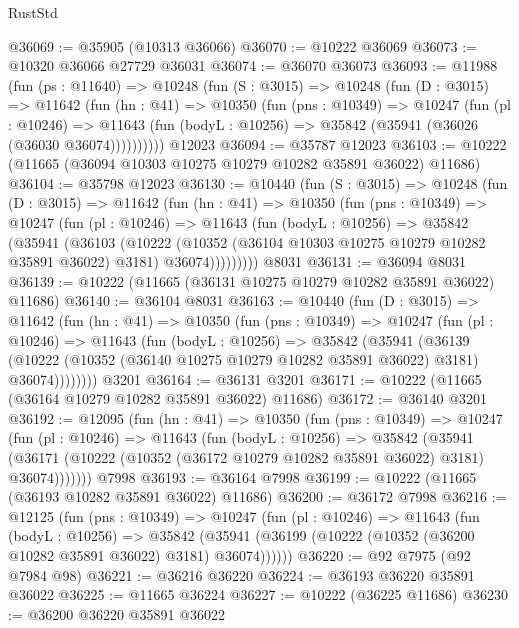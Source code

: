 \begin{lexlean}{RustStd}
\begin{coremodule}
@36069 := @35905 (@10313 @36066)
@36070 := @10222 @36069
@36073 := @10320 @36066 @27729 @36031
@36074 := @36070 @36073
@36093 := @11988
    (fun (ps : @11640) =>
    @10248
      (fun (S : @3015) =>
      @10248
        (fun (D : @3015) =>
        @11642
          (fun (hn : @41) =>
          @10350
            (fun (pns : @10349) =>
            @10247
              (fun (pl : @10246) =>
              @11643 (fun (bodyL : @10256) => @35842 (@35941 (@36026 (@36030 @36074))))))))))
    @12023
@36094 := @35787 @12023
@36103 := @10222 (@11665 (@36094 @10303 @10275 @10279 @10282 @35891 @36022) @11686)
@36104 := @35798 @12023
@36130 := @10440
    (fun (S : @3015) =>
    @10248
      (fun (D : @3015) =>
      @11642
        (fun (hn : @41) =>
        @10350
          (fun (pns : @10349) =>
          @10247
            (fun (pl : @10246) =>
            @11643
              (fun (bodyL : @10256) =>
              @35842
                (@35941
                  (@36103
                    (@10222
                      (@10352 (@36104 @10303 @10275 @10279 @10282 @35891 @36022) @3181)
                      @36074)))))))))
    @8031
@36131 := @36094 @8031
@36139 := @10222 (@11665 (@36131 @10275 @10279 @10282 @35891 @36022) @11686)
@36140 := @36104 @8031
@36163 := @10440
    (fun (D : @3015) =>
    @11642
      (fun (hn : @41) =>
      @10350
        (fun (pns : @10349) =>
        @10247
          (fun (pl : @10246) =>
          @11643
            (fun (bodyL : @10256) =>
            @35842
              (@35941
                (@36139
                  (@10222 (@10352 (@36140 @10275 @10279 @10282 @35891 @36022) @3181) @36074))))))))
    @3201
@36164 := @36131 @3201
@36171 := @10222 (@11665 (@36164 @10279 @10282 @35891 @36022) @11686)
@36172 := @36140 @3201
@36192 := @12095
    (fun (hn : @41) =>
    @10350
      (fun (pns : @10349) =>
      @10247
        (fun (pl : @10246) =>
        @11643
          (fun (bodyL : @10256) =>
          @35842
            (@35941
              (@36171 (@10222 (@10352 (@36172 @10279 @10282 @35891 @36022) @3181) @36074)))))))
    @7998
@36193 := @36164 @7998
@36199 := @10222 (@11665 (@36193 @10282 @35891 @36022) @11686)
@36200 := @36172 @7998
@36216 := @12125
    (fun (pns : @10349) =>
    @10247
      (fun (pl : @10246) =>
      @11643
        (fun (bodyL : @10256) =>
        @35842 (@35941 (@36199 (@10222 (@10352 (@36200 @10282 @35891 @36022) @3181) @36074))))))
@36220 := @92 @7975 (@92 @7984 @98)
@36221 := @36216 @36220
@36224 := @36193 @36220 @35891 @36022
@36225 := @11665 @36224
@36227 := @10222 (@36225 @11686)
@36230 := @36200 @36220 @35891 @36022

\end{coremodule}
\end{lexlean}
